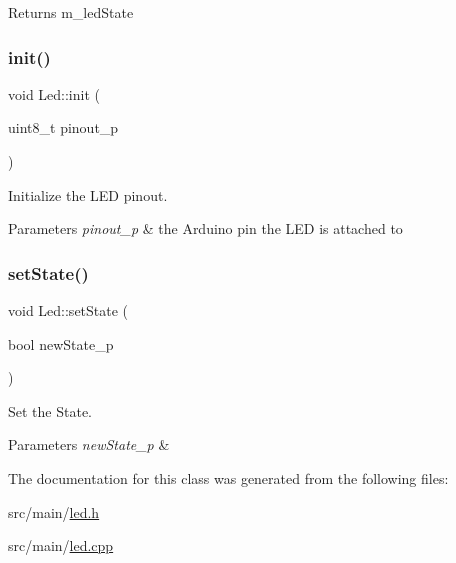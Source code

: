 \begin{DoxyReturn}{Returns}
m\+\_\+led\+State 
\end{DoxyReturn}
\mbox{\label{class_led_a4bce8445a80436df1126471f83b0fb17}} 
\subsubsection{\texorpdfstring{init()}{init()}}
{\footnotesize\ttfamily void Led\+::init (\begin{DoxyParamCaption}\item[{uint8\+\_\+t}]{pinout\+\_\+p }\end{DoxyParamCaption})}



Initialize the L\+ED pinout. 


\begin{DoxyParams}{Parameters}
{\em pinout\+\_\+p} & the Arduino pin the L\+ED is attached to \\
\hline
\end{DoxyParams}
\mbox{\label{class_led_a9136de456f7df8e202e880312767a566}} 
\subsubsection{\texorpdfstring{set\+State()}{setState()}}
{\footnotesize\ttfamily void Led\+::set\+State (\begin{DoxyParamCaption}\item[{bool}]{new\+State\+\_\+p }\end{DoxyParamCaption})}



Set the State. 


\begin{DoxyParams}{Parameters}
{\em new\+State\+\_\+p} & \\
\hline
\end{DoxyParams}


The documentation for this class was generated from the following files\+:\begin{DoxyCompactItemize}
\item 
src/main/\hyperlink{led_8h}{led.\+h}\item 
src/main/\hyperlink{led_8cpp}{led.\+cpp}\end{DoxyCompactItemize}
